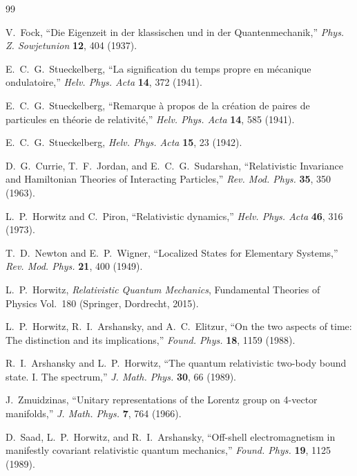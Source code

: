 \documentclass[11pt]{article}
\begin{document}
\clearpage
\begin{thebibliography}{99}

V.~Fock, ``Die Eigenzeit in der klassischen und in der Quantenmechanik,''
\textit{Phys. Z. Sowjetunion} \textbf{12}, 404 (1937).

E.~C.~G.~Stueckelberg, ``La signification du temps propre en m\'ecanique
ondulatoire,'' \textit{Helv. Phys. Acta} \textbf{14}, 372 (1941).

E.~C.~G.~Stueckelberg, ``Remarque \`a propos de la cr\'eation de paires de
particules en th\'eorie de relativit\'e,'' \textit{Helv. Phys. Acta}
\textbf{14}, 585 (1941).

E.~C.~G.~Stueckelberg, \textit{Helv. Phys. Acta} \textbf{15}, 23 (1942).

D.~G.~Currie, T.~F.~Jordan, and E.~C.~G.~Sudarshan, ``Relativistic Invariance
and Hamiltonian Theories of Interacting Particles,'' \textit{Rev. Mod. Phys.}
\textbf{35}, 350 (1963).

L.~P.~Horwitz and C.~Piron, ``Relativistic dynamics,'' \textit{Helv. Phys.
Acta} \textbf{46}, 316 (1973).

T.~D.~Newton and E.~P.~Wigner, ``Localized States for Elementary Systems,''
\textit{Rev. Mod. Phys.} \textbf{21}, 400 (1949).

L.~P.~Horwitz, \textit{Relativistic Quantum Mechanics}, Fundamental Theories
of Physics Vol.~180 (Springer, Dordrecht, 2015).

L.~P.~Horwitz, R.~I.~Arshansky, and A.~C.~Elitzur, ``On the two aspects of
time: The distinction and its implications,'' \textit{Found. Phys.}
\textbf{18}, 1159 (1988).

R.~I.~Arshansky and L.~P.~Horwitz, ``The quantum relativistic two-body bound
state. I. The spectrum,'' \textit{J. Math. Phys.} \textbf{30}, 66 (1989).

J.~Zmuidzinas, ``Unitary representations of the Lorentz group on 4-vector
manifolds,'' \textit{J. Math. Phys.} \textbf{7}, 764 (1966).

D.~Saad, L.~P.~Horwitz, and R.~I.~Arshansky, ``Off-shell electromagnetism in
manifestly covariant relativistic quantum mechanics,'' \textit{Found. Phys.}
\textbf{19}, 1125 (1989).


\end{thebibliography}
\end{document}
